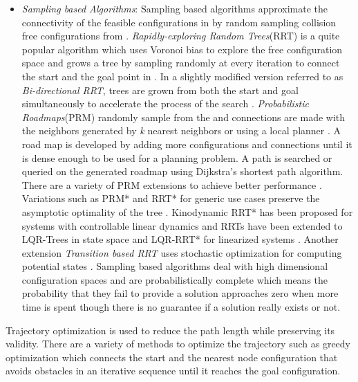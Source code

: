 \begin{itemize}
\item \textit{Sampling based Algorithms}: Sampling based algorithms approximate the connectivity of the feasible configurations in \CSfree{} by random sampling collision free configurations from \CS{} \cite{hudson1997v,gottschalk1996obbtree,hsu1997path}. \textit{Rapidly-exploring Random Trees}(RRT) is a quite popular algorithm which uses Voronoi bias to explore the free configuration space and grows a tree by sampling randomly at every iteration to connect the start and the goal point in \CSfree{}. In a slightly modified version referred to as \textit{Bi-directional RRT}, trees are grown from both the start and goal simultaneously to accelerate the process of the search \cite{kuffner2000rrt}. \textit{Probabilistic Roadmaps}(PRM) randomly sample from the \CS{} and connections are made with the neighbors generated by \textit{k} nearest neighbors or using a local planner \cite{karaman2011sampling}. A road map is developed by adding more configurations and connections until it is dense enough to be used for a planning problem. A path is searched or queried on the generated roadmap using Dijkstra's shortest path algorithm. There are a variety of PRM extensions to achieve better performance \cite{geraerts2004comparative}. Variations such as PRM* and RRT* for generic use cases preserve the asymptotic optimality of the tree \cite{karaman2011sampling}. Kinodynamic RRT* has been proposed for systems with controllable linear dynamics \cite{webb2013kinodynamic} and RRTs have been extended to LQR-Trees in state space \cite{tedrake2010lqr} and LQR-RRT* for linearized systems \cite{perez2012lqr}. Another extension \textit{Transition based RRT} uses stochastic optimization for computing potential states \cite{jaillet2008transition}. Sampling based algorithms deal with high dimensional configuration spaces and are probabilistically complete which means the probability that they fail to provide a solution approaches zero when more time is spent though there is no guarantee if a solution really exists or not.
\end{itemize}


Trajectory optimization is used to reduce the path length while preserving its validity. There are a variety of methods to optimize the trajectory such as greedy optimization \cite{thrun2002probabilistic}  which connects the start and the nearest node configuration that avoids obstacles in an iterative sequence until it reaches the goal configuration. 




